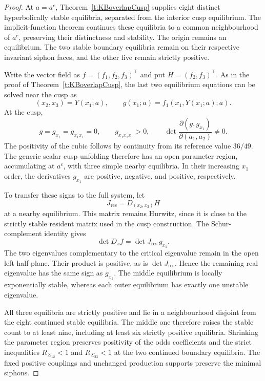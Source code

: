 \begin{proof}
At $a=a^c$, Theorem~\ref{t:KBoverlapCusp} supplies eight distinct hyperbolically
stable equilibria, separated from the interior cusp equilibrium.
The implicit-function theorem continues these equilibria to a common
neighbourhood of $a^c$, preserving their distinctness and stability.
The origin remains an equilibrium. The two stable boundary equilibria
remain on their respective invariant siphon faces, and the other five
remain strictly positive.

Write the vector field as
$f=(f_1,f_2,f_3)^\top$ and put $H=(f_2,f_3)^\top$.
As in the proof of Theorem~\ref{t:KBoverlapCusp}, the last two equilibrium
equations can be solved near the cusp as
\[
 (x_2,x_3)=Y(x_1;a),
 \qquad
 g(x_1;a)=f_1(x_1,Y(x_1;a);a).
\]
At the cusp,
\[
 g=g_{x_1}=g_{x_1x_1}=0,\qquad
 g_{x_1x_1x_1}>0,\qquad
 \det\frac{\partial(g,g_{x_1})}{\partial(a_1,a_2)}\ne0.
\]
The positivity of the cubic follows by continuity from its reference
value $36/49$. The generic scalar cusp unfolding therefore has an open
parameter region, accumulating at $a^c$, with three simple nearby
equilibria. In their increasing $x_1$ order, the derivatives
$g_{x_1}$ are positive, negative, and positive, respectively.

To transfer these signs to the full system, let
\[
 J_{\mathrm{res}}
   =D_{(x_2,x_3)}H
\]
at a nearby equilibrium. This matrix remains Hurwitz, since it is close
to the strictly stable resident matrix used in the cusp construction.
The Schur-complement identity gives
\[
 \det D_xf=\det J_{\mathrm{res}}\,g_{x_1}.
\]
The two eigenvalues complementary to the critical eigenvalue remain
in the open left half-plane. Their product is positive, as is
$\det J_{\mathrm{res}}$. Hence the remaining real eigenvalue has the
same sign as $g_{x_1}$. The middle equilibrium is locally exponentially
stable, whereas each outer equilibrium has exactly one unstable
eigenvalue.

All three equilibria are strictly positive and lie in a neighbourhood
disjoint from the eight continued stable equilibria. The middle one
therefore raises the stable count to at least nine, including at least
six strictly positive equilibria. Shrinking the parameter region
preserves positivity of the odds coefficients and the strict
inequalities $R_{\Sigma_{12}}<1$ and $R_{\Sigma_{23}}<1$ at the two
continued boundary equilibria. The fixed positive couplings and
unchanged production supports preserve the minimal siphons.
\end{proof}

